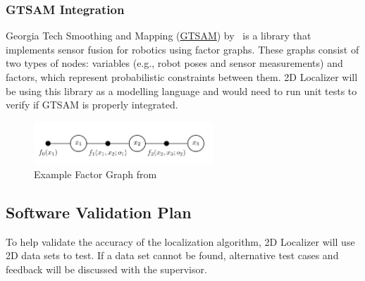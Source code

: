 \documentclass[12pt, titlepage]{article}
\begin{document}
\subsubsection{GTSAM Integration}
Georgia Tech Smoothing and Mapping (\href{https://github.com/borglab/gtsam}{GTSAM}) by~\cite{gtsam2022} is a library that implements sensor fusion for robotics using factor graphs. These graphs consist of two types of nodes: variables (e.g., robot poses and sensor measurements) and factors, which represent probabilistic constraints between them. 2D Localizer will be using this library as a modelling language and would need to run unit tests to verify if GTSAM is properly integrated.

\begin{figure}[h!]
  \begin{center}
    \includegraphics[width=0.6\textwidth]{factor_graph.png}
    \caption{Example Factor Graph from \cite{Dellaert2012}}
    \label{fig_factor} 
  \end{center}
\end{figure}




\subsection{Software Validation Plan}\label{plan_software}

To help validate the accuracy of the localization algorithm, 2D Localizer will use 2D data sets to test. If a data set cannot be found, alternative test cases and feedback will be discussed with the supervisor.
\end{document}
